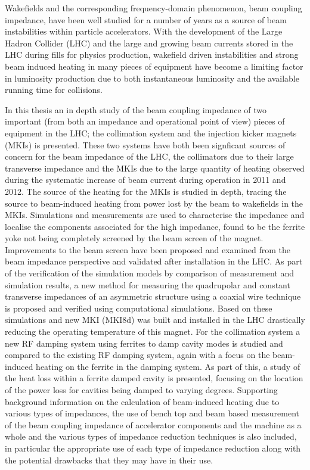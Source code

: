 Wakefields and the corresponding frequency-domain phenomenon, beam coupling impedance, have been well studied for a number of years as a source of beam instabilities within particle accelerators. With the development of the Large Hadron Collider (LHC) and the large and growing beam currents stored in the LHC during fills for physics production, wakefield driven instabilities and strong beam induced heating in many pieces of equipment have become a limiting factor in luminosity production due to both instantaneous luminosity and the available running time for collisions.

In this thesis an in depth study of the beam coupling impedance of two important (from both an impedance and operational point of view) pieces of equipment in the LHC; the collimation system and the injection kicker magnets (MKIs) is presented. These two systems have both been signficant sources of concern for the beam impedance of the LHC, the collimators due to their large transverse impedance and the MKIs due to the large quantity of heating observed during the systematic increase of beam current during operation in 2011 and 2012. The source of the heating for the MKIs is studied in depth, tracing the source to beam-induced heating from power lost by the beam to wakefields in the MKIs. Simulations and measurements are used to characterise the impedance and localise the components associated for the high impedance, found to be the ferrite yoke not being completely screened by the beam screen of the magnet. Improvements to the beam screen have been proposed and examined from the beam impedance perspective and validated after installation in the LHC. As part of the verification of the simulation models by comparison of measurement and simulation results, a new method for measuring the quadrupolar and constant transverse impedances of an asymmetric structure using a coaxial wire technique is proposed and verified using computational simulations. Based on these simulations and new MKI (MKI8d) was built and installed in the LHC drastically reducing the operating temperature of this magnet. For the collimation system a new RF damping system using ferrites to damp cavity modes is studied and compared to the existing RF damping system, again with a focus on the beam-induced heating on the ferrite in the damping system. As part of this, a study of the heat loss within a ferrite damped cavity is presented, focusing on the location of the power loss for cavities being damped to varying degrees. Supporting background information on the calculation of beam-induced heating due to various types of impedances, the use of bench top and beam based measurement of the beam coupling impedance of accelerator components and the machine as a whole and the various types of impedance reduction techniques is also included, in particular the appropriate use of each type of impedance reduction along with the potential drawbacks that they may have in their use.